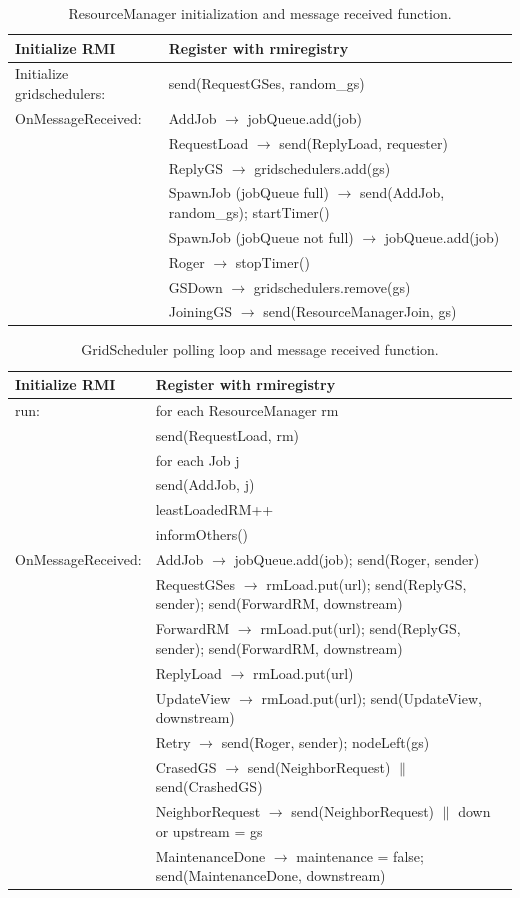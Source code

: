 \documentclass[twocolumn,a4paper]{article}
\begin{document}
\begin{table}
\begin{tabular}{ |l|l| }
  \hline
  Initialize RMI & Register with rmiregistry \\
  \hline
  Initialize gridschedulers: & send(RequestGSes, random\_gs) \\
  \hline
  OnMessageReceived: & AddJob $\rightarrow$ jobQueue.add(job) \\
  & RequestLoad $\rightarrow$ send(ReplyLoad, requester) \\
  & ReplyGS $\rightarrow$ gridschedulers.add(gs) \\
  & SpawnJob (jobQueue full) $\rightarrow$ send(AddJob, random\_gs); startTimer() \\
  & SpawnJob (jobQueue not full) $\rightarrow$ jobQueue.add(job) \\
  & Roger $\rightarrow$ stopTimer() \\
  & GSDown $\rightarrow$  gridschedulers.remove(gs) \\
  & JoiningGS $\rightarrow$ send(ResourceManagerJoin, gs) \\
  \hline
\end{tabular}
\caption{ResourceManager initialization and message received function.}
\end{table}

\begin{table}
\begin{tabular}{ |l|l| }
  \hline
  Initialize RMI & Register with rmiregistry \\
  \hline
  run: & for each ResourceManager rm\\
  & send(RequestLoad, rm) \\
  & for each Job j\\
  & send(AddJob, j)\\
  & leastLoadedRM++\\
  & informOthers()\\
  \hline
  OnMessageReceived: & AddJob $\rightarrow$ jobQueue.add(job); send(Roger, sender) \\
  & RequestGSes $\rightarrow$ rmLoad.put(url); send(ReplyGS, sender); send(ForwardRM, downstream) \\
  & ForwardRM $\rightarrow$ rmLoad.put(url); send(ReplyGS, sender); send(ForwardRM, downstream) \\
  & ReplyLoad $\rightarrow$ rmLoad.put(url) \\
  & UpdateView $\rightarrow$ rmLoad.put(url); send(UpdateView, downstream) \\
  & Retry $\rightarrow$ send(Roger, sender); nodeLeft(gs) \\
  & CrasedGS $\rightarrow$  send(NeighborRequest) $\|$ send(CrashedGS) \\
  & NeighborRequest $\rightarrow$ send(NeighborRequest) $\|$ down or upstream = gs  \\
  & MaintenanceDone $\rightarrow$ maintenance = false; send(MaintenanceDone, downstream)\\
  \hline
\end{tabular}
\caption{GridScheduler polling loop and message received function.}
\end{table}
\end{document}
